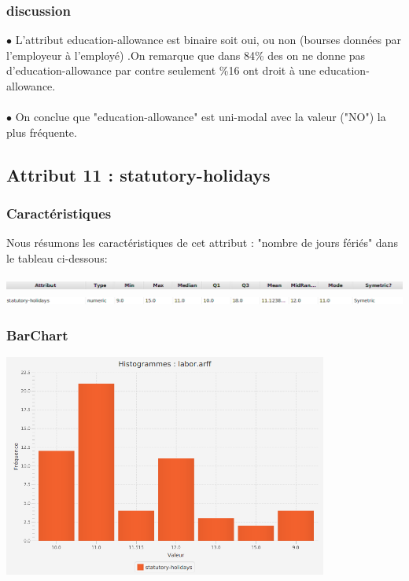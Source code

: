 \documentclass[12pt,a4paper,oneside]{book}
\begin{document}
	\subsubsection{discussion}
	$\bullet$ L'attribut education-allowance est binaire soit oui, ou non (bourses données par l'employeur à l'employé) .On remarque que dans 84\%  des on ne donne pas d'education-allowance  par contre  seulement \%16  ont droit à une education-allowance.\\
	\textbf{ }\\
	$\bullet$ On conclue que "education-allowance" est uni-modal avec la valeur ("NO") la plus fréquente.
	
	
	\newpage
	
	\subsection{Attribut 11 : statutory-holidays}
	\subsubsection{Caractéristiques}
	Nous résumons les caractéristiques de cet attribut : "nombre de jours fériés" dans le tableau ci-dessous:
	\begin{center}
		\includegraphics[width=1\textwidth]{screens/att.png}\\ \includegraphics[width=1\textwidth]{screens/att-11.png}%
		\label{labelname}%
	\end{center}
	
	\subsubsection{BarChart}
	\begin{center}
		\includegraphics[width=0.8\textwidth]{screens/barchart/statutory-holidays-barchart.png}%
		\label{labelname}%
	\end{center}
	
\end{document}
